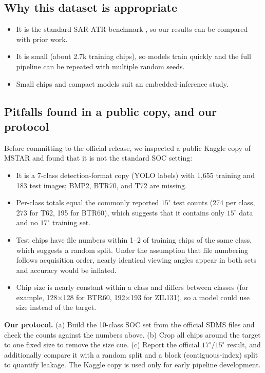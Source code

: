 \documentclass[10pt,letterpaper]{article}
\begin{document}
\subsection{Why this dataset is appropriate}
\begin{itemize}
\item It is the standard SAR ATR benchmark \cite{keydel,chen}, so our results can be compared with prior work.
\item It is small (about 2.7k training chips), so models train quickly and the full pipeline can be repeated with multiple random seeds.
\item Small chips and compact models suit an embedded-inference study.
\end{itemize}

\subsection{Pitfalls found in a public copy, and our protocol}
Before committing to the official release, we inspected a public Kaggle copy of MSTAR and found that it is not the standard SOC setting:
\begin{itemize}
\item It is a 7-class detection-format copy (YOLO labels) with 1,655 training and 183 test images; BMP2, BTR70, and T72 are missing.
\item Per-class totals equal the commonly reported $15^\circ$ test counts (274 per class, 273 for T62, 195 for BTR60), which suggests that it contains only $15^\circ$ data and no $17^\circ$ training set.
\item Test chips have file numbers within 1--2 of training chips of the same class, which suggests a random split. Under the assumption that file numbering follows acquisition order, nearly identical viewing angles appear in both sets and accuracy would be inflated.
\item Chip size is nearly constant within a class and differs between classes (for example, 128$\times$128 for BTR60, 192$\times$193 for ZIL131), so a model could use size instead of the target.
\end{itemize}
\textbf{Our protocol.} (a) Build the 10-class SOC set from the official SDMS files and check the counts against the numbers above. (b) Crop all chips around the target to one fixed size to remove the size cue. (c) Report the official $17^\circ/15^\circ$ result, and additionally compare it with a random split and a block (contiguous-index) split to quantify leakage. The Kaggle copy is used only for early pipeline development.
\end{document}
